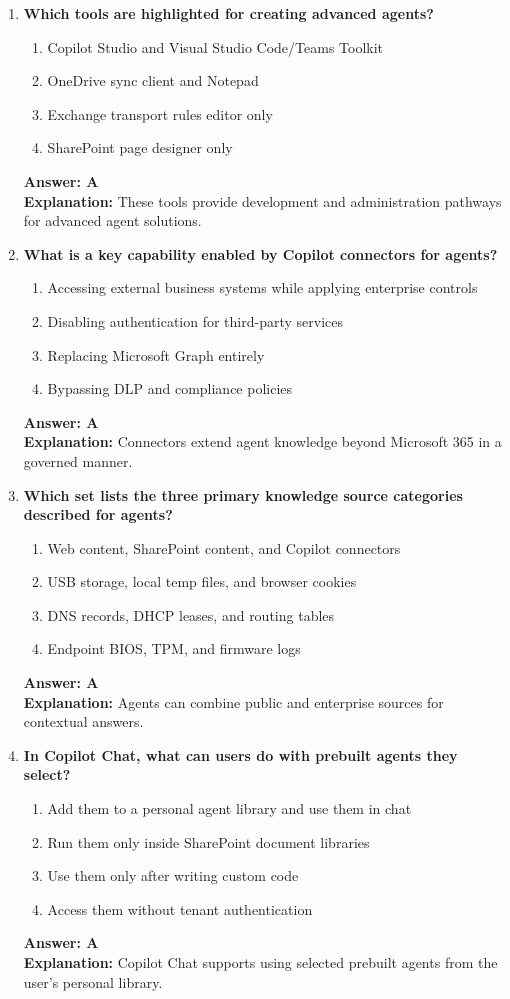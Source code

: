 \documentclass[10pt]{article}
\begin{document}
\begin{enumerate}[leftmargin=*]
\item \textbf{Which tools are highlighted for creating advanced agents?}
\begin{enumerate}[label=\Alph*.]
  \item Copilot Studio and Visual Studio Code/Teams Toolkit
  \item OneDrive sync client and Notepad
  \item Exchange transport rules editor only
  \item SharePoint page designer only
\end{enumerate}
\textbf{Answer: A}\\
\textbf{Explanation:} These tools provide development and administration pathways for advanced agent solutions.

\item \textbf{What is a key capability enabled by Copilot connectors for agents?}
\begin{enumerate}[label=\Alph*.]
  \item Accessing external business systems while applying enterprise controls
  \item Disabling authentication for third-party services
  \item Replacing Microsoft Graph entirely
  \item Bypassing DLP and compliance policies
\end{enumerate}
\textbf{Answer: A}\\
\textbf{Explanation:} Connectors extend agent knowledge beyond Microsoft 365 in a governed manner.

\item \textbf{Which set lists the three primary knowledge source categories described for agents?}
\begin{enumerate}[label=\Alph*.]
  \item Web content, SharePoint content, and Copilot connectors
  \item USB storage, local temp files, and browser cookies
  \item DNS records, DHCP leases, and routing tables
  \item Endpoint BIOS, TPM, and firmware logs
\end{enumerate}
\textbf{Answer: A}\\
\textbf{Explanation:} Agents can combine public and enterprise sources for contextual answers.

\item \textbf{In Copilot Chat, what can users do with prebuilt agents they select?}
\begin{enumerate}[label=\Alph*.]
  \item Add them to a personal agent library and use them in chat
  \item Run them only inside SharePoint document libraries
  \item Use them only after writing custom code
  \item Access them without tenant authentication
\end{enumerate}
\textbf{Answer: A}\\
\textbf{Explanation:} Copilot Chat supports using selected prebuilt agents from the user’s personal library.


\end{enumerate}
\end{document}
